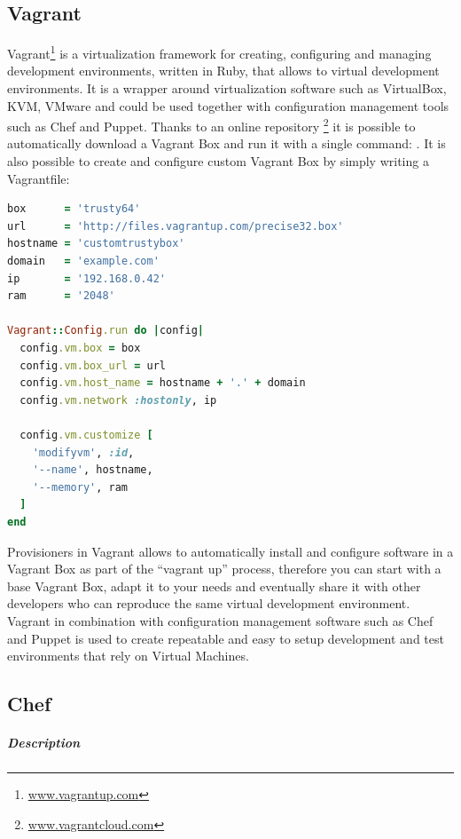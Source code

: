 \subsection{Vagrant}
\label{sub:sota_vagrant}
Vagrant\footnote{\url{www.vagrantup.com}} is a virtualization framework for creating, configuring and managing development environments, written in Ruby, that allows to  virtual development environments. It is a wrapper around virtualization software such as VirtualBox, KVM, VMware and could be used together with configuration management tools such as Chef and Puppet.
Thanks to an online repository \footnote{\url{www.vagrantcloud.com}} it is possible to automatically download a Vagrant Box and run it with a single command: .
It is also possible to create and configure custom Vagrant Box by simply writing a Vagrantfile:
\begin{lstlisting}[language=Ruby,numbers=none]
box      = 'trusty64'
url      = 'http://files.vagrantup.com/precise32.box'
hostname = 'customtrustybox'
domain   = 'example.com'
ip       = '192.168.0.42'
ram      = '2048'

Vagrant::Config.run do |config|
  config.vm.box = box
  config.vm.box_url = url
  config.vm.host_name = hostname + '.' + domain
  config.vm.network :hostonly, ip

  config.vm.customize [
    'modifyvm', :id,
    '--name', hostname,
    '--memory', ram
  ]
end
\end{lstlisting}
Provisioners in Vagrant allows to automatically install and configure software in a Vagrant Box as part of the ``vagrant up'' process, therefore you can start with a base Vagrant Box, adapt it to your needs and eventually share it with other developers who can reproduce the same virtual development environment.
Vagrant in combination with configuration management software such as Chef and Puppet is used to create repeatable and easy to setup development and test environments that rely on Virtual Machines.



\subsection{Chef}
\label{sub:sota_chef}

\subparagraph{Description}
\label{subp:sota_chef_desc}

